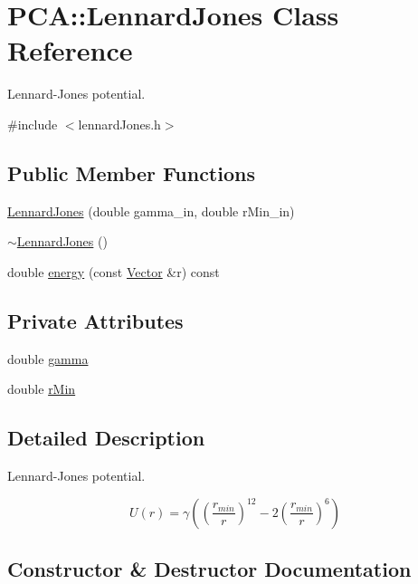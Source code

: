 \hypertarget{class_p_c_a_1_1_lennard_jones}{}\section{P\+CA\+:\+:Lennard\+Jones Class Reference}
\label{class_p_c_a_1_1_lennard_jones}


Lennard-\/\+Jones potential.  




{\ttfamily \#include $<$lennard\+Jones.\+h$>$}

\subsection*{Public Member Functions}
\begin{DoxyCompactItemize}
\item 
\hyperlink{class_p_c_a_1_1_lennard_jones_a177de9041d696f41ac2b498973047759}{Lennard\+Jones} (double gamma\+\_\+in, double r\+Min\+\_\+in)
\item 
\hyperlink{class_p_c_a_1_1_lennard_jones_ac8acfe0ebd2e7f263d6561ab515f0028}{$\sim$\+Lennard\+Jones} ()
\item 
double \hyperlink{class_p_c_a_1_1_lennard_jones_a310360e70f05d8ca7a809823e9c01422}{energy} (const \hyperlink{class_p_c_a_1_1_vector}{Vector} \&r) const
\end{DoxyCompactItemize}
\subsection*{Private Attributes}
\begin{DoxyCompactItemize}
\item 
double \hyperlink{class_p_c_a_1_1_lennard_jones_ad28ea138038c2c43e9fd000752ea6130}{gamma}
\item 
double \hyperlink{class_p_c_a_1_1_lennard_jones_aa59f5f2bb7cf5c83a33a7f95d23ef4c8}{r\+Min}
\end{DoxyCompactItemize}


\subsection{Detailed Description}
Lennard-\/\+Jones potential. 

\[ U(r)= \gamma \left( \left(\frac{r_{min}}{r}\right)^{12} - 2 \left(\frac{r_{min}}{r}\right)^6\right)\] 

\subsection{Constructor \& Destructor Documentation}
\hypertarget{class_p_c_a_1_1_lennard_jones_a177de9041d696f41ac2b498973047759}{}\label{class_p_c_a_1_1_lennard_jones_a177de9041d696f41ac2b498973047759} 
